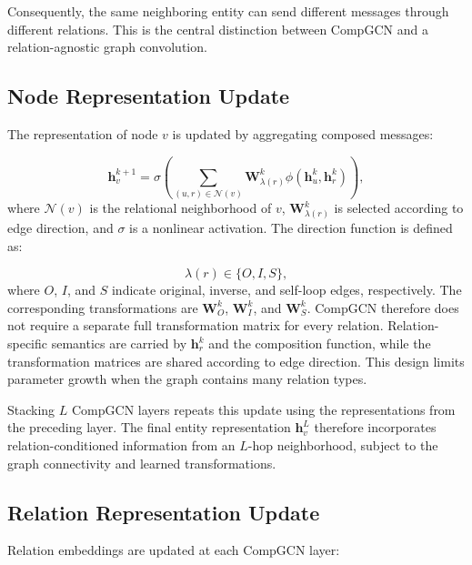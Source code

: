 Consequently, the same neighboring entity can send different messages through
different relations. This is the central distinction between CompGCN and a
relation-agnostic graph convolution.

\subsection{Node Representation Update}

The representation of node $v$ is updated by aggregating composed messages:

\begin{equation}
    \mathbf{h}_{v}^{k+1}
    =
    \sigma
    \left(
        \sum_{(u,r)\in\mathcal{N}(v)}
        \mathbf{W}_{\lambda(r)}^{k}
        \phi
        \left(
            \mathbf{h}_{u}^{k},
            \mathbf{h}_{r}^{k}
        \right)
    \right),
    \label{eq:compgcn_node_update}
\end{equation}
where $\mathcal{N}(v)$ is the relational neighborhood of $v$,
$\mathbf{W}_{\lambda(r)}^{k}$ is selected according to edge direction, and
$\sigma$ is a nonlinear activation. The direction function is defined as:

\begin{equation}
    \lambda(r)
    \in
    \{O,I,S\},
\end{equation}
where $O$, $I$, and $S$ indicate original, inverse, and self-loop edges,
respectively. The corresponding transformations are
$\mathbf{W}_{O}^{k}$, $\mathbf{W}_{I}^{k}$, and $\mathbf{W}_{S}^{k}$.
CompGCN therefore does not require a separate full transformation matrix for
every relation. Relation-specific semantics are carried by
$\mathbf{h}_{r}^{k}$ and the composition function, while the transformation
matrices are shared according to edge direction. This design limits parameter
growth when the graph contains many relation types.

Stacking $L$ CompGCN layers repeats this update using the representations from
the preceding layer. The final entity representation
$\mathbf{h}_{v}^{L}$ therefore incorporates relation-conditioned information
from an $L$-hop neighborhood, subject to the graph connectivity and learned
transformations.

\subsection{Relation Representation Update}

Relation embeddings are updated at each CompGCN layer:

